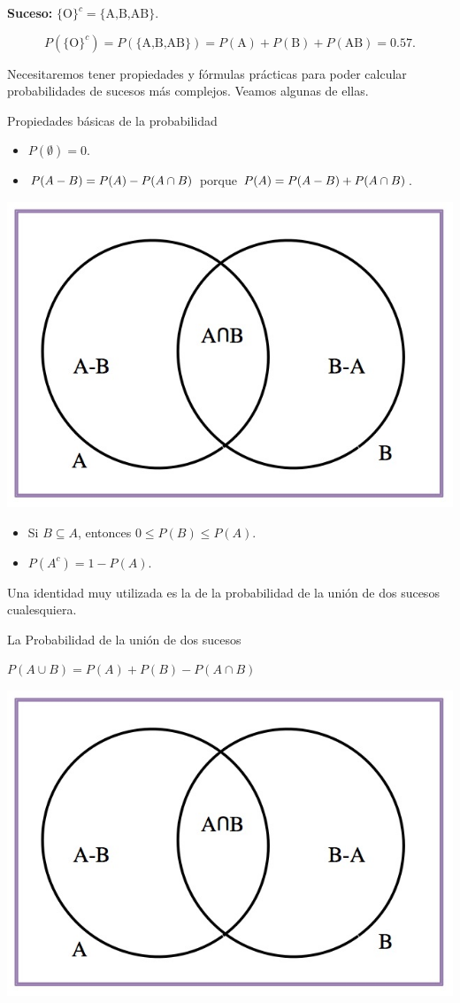 \documentclass[
  letterpaper,
  DIV=11,
  numbers=noendperiod]{scrreprt}
\begin{document}
\textbf{Suceso:} \(\{\mbox{O}\}^c=\{\mbox{A,B,AB}\}\).

\[P(\{\mbox{O}\}^c)\!=\!P(\{\mbox{A,B,AB}\})\!=\!
P(\mbox{A})+P (\mbox{B})+P(\mbox{AB})\!=\!0.57.\]

Necesitaremos tener propiedades y fórmulas prácticas para poder calcular
probabilidades de sucesos más complejos. Veamos algunas de ellas.

Propiedades básicas de la probabilidad

\begin{itemize}
\item
  \(P(\emptyset)=0\).
\item
  \(\scriptsize{P(A-B)=P(A)-P(A\cap B)}\) porque
  \(\scriptsize{P(A)=P(A-B)+P(A\cap B)}\).
\end{itemize}

\begin{center}
\includegraphics[width=0.3\linewidth,height=\textheight,keepaspectratio]{Images/proba1dibujos/A-B.jpg}
\end{center}

\begin{itemize}
\item
  Si \(B\subseteq A\), entonces \(0\leq P(B)\leq P(A)\).
\item
  \(P(A^c)=1-P(A)\).
\end{itemize}

Una identidad muy utilizada es la de la probabilidad de la unión de dos
sucesos cualesquiera.

La Probabilidad de la unión de dos sucesos

\(P(A\cup B)=P(A)+P(B)-P(A\cap B)\)

\begin{center}
\includegraphics[width=0.6\linewidth,height=\textheight,keepaspectratio]{Images/proba1dibujos/A-B.jpg}
\end{center}
\end{document}
